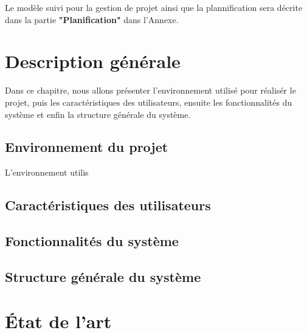 \documentclass{polytech/polytech}
\begin{document}
        Le modèle suivi pour la gestion de projet ainsi que la plannification sera décrite dans la partie \textbf{"Planification"} dans l'Annexe.
        
        
        
        
        
        
    \chapter{Description générale}
    
    Dans ce chapitre, nous allons présenter l'environnement utilisé pour réalisér le projet, puis les caractéristiques des utilisateurs, ensuite les fonctionnalités du système et enfin la structure générale du système.
    
        \section{Environnement du projet}
        
        L'environnement utilis
        
        \section{Caractéristiques des utilisateurs}
        \section{Fonctionnalités du système}
        \section{Structure générale du système}
    
    \chapter{État de l'art}
    
        \section{}
        \section{}
        \section{}
    
\end{document}
